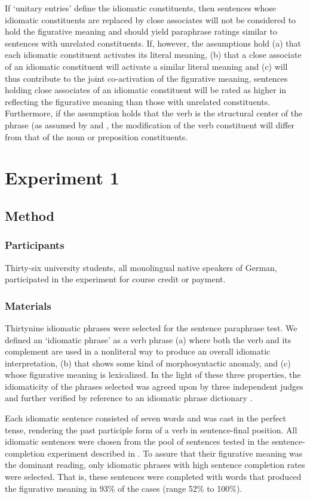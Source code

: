 \documentclass[output=paper]{langsci/langscibook}
\begin{document}
If ‘unitary entries’ define the idiomatic constituents, then sentences whose idiomatic constituents are replaced by close associates will not be considered to hold the figurative meaning and should yield paraphrase ratings similar to sentences with unrelated constituents. If, however, the assumptions hold (a) that each idiomatic constituent activates its literal meaning, (b) that a close associate of an idiomatic constituent will activate a similar literal meaning and (c) will thus contribute to the joint co-activation of the figurative meaning, sentences holding close associates of an idiomatic constituent will be rated as higher in reflecting the figurative meaning than those with unrelated constituents. Furthermore, if the assumption holds that the verb is the structural center of the phrase (as assumed by \citet{rabanus:2008} and \citet{smolka:2007}, the modification of the verb constituent will differ from that of the noun or preposition constituents.


\section{Experiment 1}

\subsection{Method}
\subsubsection{Participants}
Thirty-six university students, all monolingual native speakers of German, participated in the experiment for course credit or payment.

\subsubsection{Materials}
Thirtynine idiomatic phrases were selected for the sentence paraphrase test. We defined an ‘idiomatic phrase’ as a verb phrase (a) where both the verb and its complement are used in a nonliteral way to produce an overall idiomatic interpretation, (b) that shows some kind of morphosyntactic anomaly, and (c) whose figurative meaning is lexicalized.  In the light of these three properties, the idiomaticity of the phrases selected was agreed upon by three independent judges and further verified by reference to an idiomatic phrase dictionary \citep{redewendungen:2002}.

Each idiomatic sentence consisted of seven words and was cast in the perfect tense, rendering the past participle form of a verb in sentence-final position. All idiomatic sentences were chosen from the pool of sentences tested in the sentence-completion experiment described in \citet{smolka:2007}. To assure that their figurative meaning was the dominant reading, only idiomatic phrases with high sentence completion rates were selected. That is, these sentences were completed with words that produced the figurative meaning in 93\% of the cases (range 52\% to 100\%).
\end{document}

